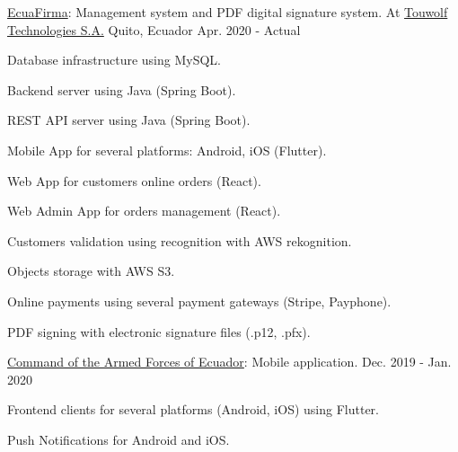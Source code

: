 
\begin{cventries}

  \cventry
    {\href{https://ecuafirma.com}{EcuaFirma}: Management system and PDF digital signature system.} %
    {At \href{https://touwolf.com/}{Touwolf Technologies S.A.}} %
    {Quito, Ecuador} %
    {Apr. 2020 - Actual} %
    {
      \begin{cvitems} %
        \item {Database infrastructure using MySQL.}
        \item {Backend server using Java (Spring Boot).}
        \item {REST API server using Java (Spring Boot).}
        \item {Mobile App for several platforms: Android, iOS (Flutter).}
        \item {Web App for customers online orders (React).}
        \item {Web Admin App for orders management (React).}
        \item {Customers validation using recognition with AWS rekognition.}
        \item {Objects storage with AWS S3.}
        \item {Online payments using several payment gateways (Stripe, Payphone).}
        \item {PDF signing with electronic signature files (.p12, .pfx).}
      \end{cvitems}
    }

  \cventry
    {\href{https://www.ccffaa.mil.ec/}{Command of the Armed Forces of Ecuador}: Mobile application.} %
    {} %
    {} %
    {Dec. 2019 - Jan. 2020} %
    {
      \begin{cvitems} %
        \item {Frontend clients for several platforms (Android, iOS) using Flutter.}
        \item {Push Notifications for Android and iOS.}
      \end{cvitems}
    }


\end{cventries}
